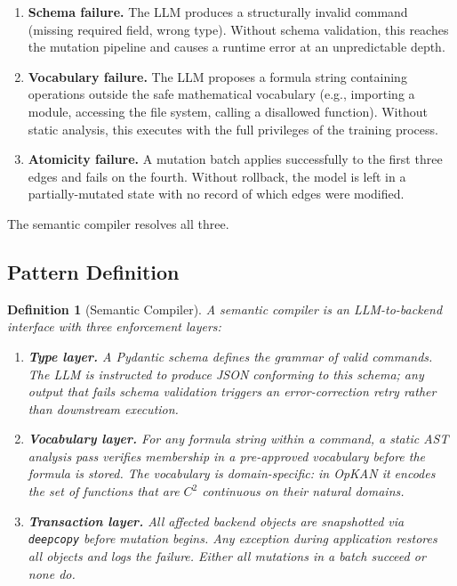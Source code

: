\documentclass[11pt,a4paper]{article}
\newtheorem{definition}{Definition}
\begin{document}
\begin{enumerate}[nosep]
  \item \textbf{Schema failure.} The LLM produces a structurally invalid command
  (missing required field, wrong type). Without schema validation, this reaches the
  mutation pipeline and causes a runtime error at an unpredictable depth.

  \item \textbf{Vocabulary failure.} The LLM proposes a formula string containing
  operations outside the safe mathematical vocabulary (e.g., importing a module,
  accessing the file system, calling a disallowed function). Without static analysis,
  this executes with the full privileges of the training process.

  \item \textbf{Atomicity failure.} A mutation batch applies successfully to the
  first three edges and fails on the fourth. Without rollback, the model is left in
  a partially-mutated state with no record of which edges were modified.
\end{enumerate}

The semantic compiler resolves all three.

\subsection{Pattern Definition}

\begin{definition}[Semantic Compiler]
A \emph{semantic compiler} is an LLM-to-backend interface with three enforcement layers:
\begin{enumerate}[nosep]
  \item \textbf{Type layer.} A Pydantic schema defines the grammar of valid commands.
  The LLM is instructed to produce JSON conforming to this schema; any output that
  fails schema validation triggers an error-correction retry rather than downstream
  execution.

  \item \textbf{Vocabulary layer.} For any formula string within a command, a static
  AST analysis pass verifies membership in a pre-approved vocabulary before the
  formula is stored. The vocabulary is domain-specific: in OpKAN it encodes the set
  of functions that are $C^2$ continuous on their natural domains.

  \item \textbf{Transaction layer.} All affected backend objects are snapshotted via
  \texttt{deepcopy} before mutation begins. Any exception during application restores
  all objects and logs the failure. Either all mutations in a batch succeed or none do.
\end{enumerate}
\end{definition}
\end{document}
